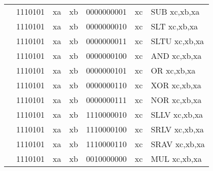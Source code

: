 \begin{table}[p]
\begin{small}
\begin{center}
\begin{tabular}{rcccccccccl}
&
\multicolumn{2}{|c|}{1110101} &
\multicolumn{1}{c|}{xa} &
\multicolumn{1}{c|}{xb} &
\multicolumn{4}{c|}{0000000001} &
\multicolumn{1}{c|}{xc} & SUB xc,xb,xa \\
\cline{2-10}
  

&
\multicolumn{2}{|c|}{1110101} &
\multicolumn{1}{c|}{xa} &
\multicolumn{1}{c|}{xb} &
\multicolumn{4}{c|}{0000000010} &
\multicolumn{1}{c|}{xc} & SLT xc,xb,xa \\
\cline{2-10}
  

&
\multicolumn{2}{|c|}{1110101} &
\multicolumn{1}{c|}{xa} &
\multicolumn{1}{c|}{xb} &
\multicolumn{4}{c|}{0000000011} &
\multicolumn{1}{c|}{xc} & SLTU xc,xb,xa \\
\cline{2-10}
  

&
\multicolumn{2}{|c|}{1110101} &
\multicolumn{1}{c|}{xa} &
\multicolumn{1}{c|}{xb} &
\multicolumn{4}{c|}{0000000100} &
\multicolumn{1}{c|}{xc} & AND xc,xb,xa \\
\cline{2-10}
  

&
\multicolumn{2}{|c|}{1110101} &
\multicolumn{1}{c|}{xa} &
\multicolumn{1}{c|}{xb} &
\multicolumn{4}{c|}{0000000101} &
\multicolumn{1}{c|}{xc} & OR xc,xb,xa \\
\cline{2-10}
  

&
\multicolumn{2}{|c|}{1110101} &
\multicolumn{1}{c|}{xa} &
\multicolumn{1}{c|}{xb} &
\multicolumn{4}{c|}{0000000110} &
\multicolumn{1}{c|}{xc} & XOR xc,xb,xa \\
\cline{2-10}
  

&
\multicolumn{2}{|c|}{1110101} &
\multicolumn{1}{c|}{xa} &
\multicolumn{1}{c|}{xb} &
\multicolumn{4}{c|}{0000000111} &
\multicolumn{1}{c|}{xc} & NOR xc,xb,xa \\
\cline{2-10}
  

&
\multicolumn{2}{|c|}{1110101} &
\multicolumn{1}{c|}{xa} &
\multicolumn{1}{c|}{xb} &
\multicolumn{4}{c|}{1110000010} &
\multicolumn{1}{c|}{xc} & SLLV xc,xb,xa \\
\cline{2-10}
  

&
\multicolumn{2}{|c|}{1110101} &
\multicolumn{1}{c|}{xa} &
\multicolumn{1}{c|}{xb} &
\multicolumn{4}{c|}{1110000100} &
\multicolumn{1}{c|}{xc} & SRLV xc,xb,xa \\
\cline{2-10}
  

&
\multicolumn{2}{|c|}{1110101} &
\multicolumn{1}{c|}{xa} &
\multicolumn{1}{c|}{xb} &
\multicolumn{4}{c|}{1110000110} &
\multicolumn{1}{c|}{xc} & SRAV xc,xb,xa \\
\cline{2-10}
  

&
\multicolumn{2}{|c|}{1110101} &
\multicolumn{1}{c|}{xa} &
\multicolumn{1}{c|}{xb} &
\multicolumn{4}{c|}{0010000000} &
\multicolumn{1}{c|}{xc} & MUL xc,xb,xa \\
\cline{2-10}
  


\end{tabular}
\end{center}
\end{small}
\end{table}
